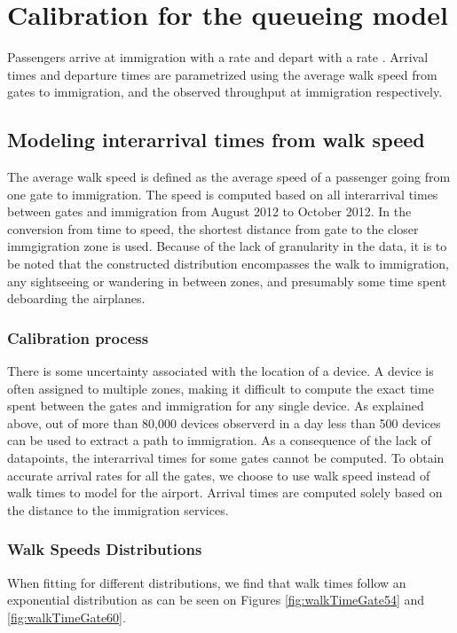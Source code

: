 \documentclass[11pt,onecolumn]{IEEEtran}
\begin{document}
\clearpage
\section{Calibration for the queueing model}
Passengers arrive at immigration with a rate  and depart with a rate .
Arrival times and departure times are parametrized using the average walk speed from gates to immigration, and the observed throughput at immigration respectively.\\
\subsection{Modeling interarrival times from walk speed}
The average walk speed is defined  as the average speed of a passenger going from one gate to immigration.
The speed is computed based on all interarrival times between gates and immigration from August 2012 to October 2012. In the conversion from time to speed, the shortest distance from gate to the closer immgigration zone is used.
Because of the lack of granularity in the data, it is to be noted that the constructed distribution encompasses the walk to immigration, any sightseeing or wandering in between zones, and presumably some time spent deboarding the airplanes.\\ 
\subsubsection{Calibration process}
There is some uncertainty associated with the location of a device.
A device is often assigned to multiple zones, making it difficult to compute the exact time spent between the gates and immigration for any single device. As explained above, out of more than 80,000 devices observerd in a day less than 500 devices can be used to extract a path to immigration.
As a consequence of the lack of datapoints, the interarrival times for some gates cannot be computed. 
To obtain accurate arrival rates for all the gates, we choose to use walk speed instead of walk times to model for the airport. Arrival times are computed solely based on the distance to the immigration services. \\
\subsubsection{Walk Speeds Distributions}
When fitting for different distributions, we find that walk times follow an exponential distribution as can be seen on Figures  \ref{fig:walkTimeGate54} and \ref{fig:walkTimeGate60}.
\end{document}
